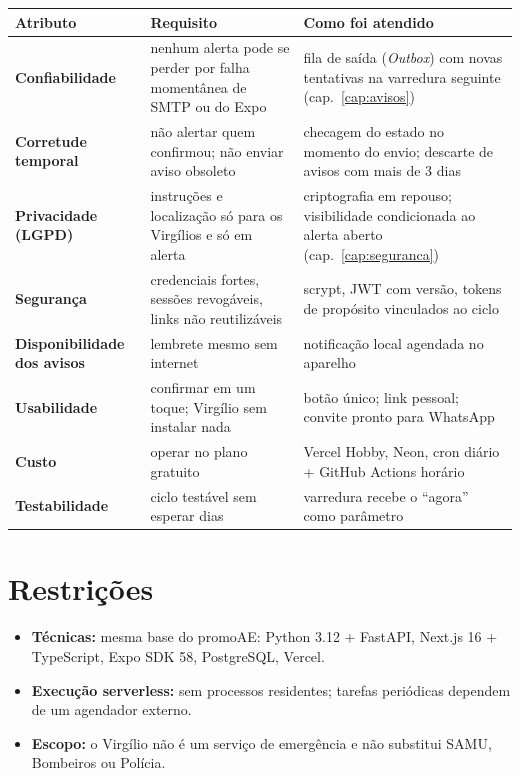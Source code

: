 \documentclass[11pt,a4paper]{report}
\begin{document}
\begin{center}
\begin{tabularx}{\textwidth}{@{}>{\bfseries}l Y Y@{}}
\toprule
Atributo & Requisito & Como foi atendido \\
\midrule
Confiabilidade & nenhum alerta pode se perder por falha momentânea de SMTP ou do Expo & fila de saída (\emph{Outbox}) com novas tentativas na varredura seguinte (cap.~\ref{cap:avisos}) \\
Corretude temporal & não alertar quem confirmou; não enviar aviso obsoleto & checagem do estado no momento do envio; descarte de avisos com mais de 3 dias \\
Privacidade (LGPD) & instruções e localização só para os Virgílios e só em alerta & criptografia em repouso; visibilidade condicionada ao alerta aberto (cap.~\ref{cap:seguranca}) \\
Segurança & credenciais fortes, sessões revogáveis, links não reutilizáveis & scrypt, JWT com versão, tokens de propósito vinculados ao ciclo \\
Disponibilidade dos avisos & lembrete mesmo sem internet & notificação local agendada no aparelho \\
Usabilidade & confirmar em um toque; Virgílio sem instalar nada & botão único; link pessoal; convite pronto para WhatsApp \\
Custo & operar no plano gratuito & Vercel Hobby, Neon, cron diário + GitHub Actions horário \\
Testabilidade & ciclo testável sem esperar dias & varredura recebe o ``agora'' como parâmetro \\
\bottomrule
\end{tabularx}
\end{center}

\section{Restrições}

\begin{itemize}
  \item \textbf{Técnicas:} mesma base do promoAE: Python 3.12 + FastAPI, Next.js 16 + TypeScript, Expo SDK 58, PostgreSQL, Vercel.
  \item \textbf{Execução serverless:} sem processos residentes; tarefas periódicas dependem de um agendador externo.
  \item \textbf{Escopo:} o Virgílio não é um serviço de emergência e não substitui SAMU, Bombeiros ou Polícia.
\end{itemize}
\end{document}
